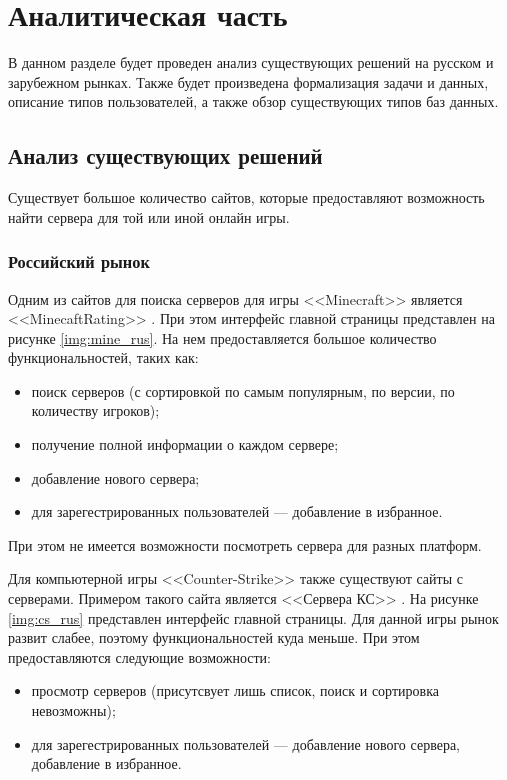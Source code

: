 \chapter{Аналитическая часть}

В данном разделе будет проведен анализ существующих решений на русском и зарубежном рынках. Также будет произведена формализация задачи и данных, описание типов пользователей, а также обзор существующих типов баз данных.

\section{Анализ существующих решений}

Существует большое количество сайтов, которые предоставляют возможность найти сервера для той или иной онлайн игры.


\subsection{Российский рынок}

Одним из сайтов для поиска серверов для игры <<Minecraft>> \cite{minecraft} является \newline <<MinecaftRating>> \cite{mine-rating}. При этом интерфейс главной страницы представлен на рисунке \ref{img:mine_rus}. На нем предоставляется большое количество функциональностей, таких как: 

\begin{itemize}
    \item поиск серверов (с сортировкой по самым популярным, по версии, по количеству игроков);
    \item получение полной информации о каждом сервере;
    \item добавление нового сервера;
    \item для зарегестрированных пользователей --- добавление в избранное.
\end{itemize}

При этом не имеется возможности посмотреть сервера для разных платформ.

Для компьютерной игры <<Counter-Strike>> \cite{cs} также существуют сайты с серверами. 
Примером такого сайта является <<Сервера КС>> \cite{servers-cs}. На рисунке \ref{img:cs_rus} представлен интерфейс главной страницы. Для данной игры рынок развит слабее, поэтому функциональностей куда меньше. При этом предоставляются следующие возможности:

\begin{itemize}
    \item просмотр серверов (присутсвует лишь список, поиск и сортировка невозможны); 
    \item для зарегестрированных пользователей --- добавление нового сервера, добавление в избранное.
\end{itemize}

